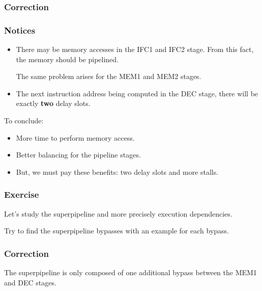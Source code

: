 
\begin{frame}
  \frametitle{Correction}

  \begin{center}
  \end{center}
\end{frame}


\begin{frame}
  \frametitle{Notices}

  \begin{itemize}
    \item
      There may be memory accesses in the IFC1 and IFC2 stage. From this
      fact, the memory should be pipelined.

      \-

      The same problem arises for the MEM1 and MEM2 stages.
    \item
      The next instruction address being computed in the DEC stage, there
      will be exactly \textbf{two} delay slots.
  \end{itemize}

  To conclude:

  \begin{itemize}
    \item
      More time to perform memory access.
    \item
      Better balancing for the pipeline stages.
    \item
      But, we must pay these benefits: two delay slots and more stalls.
  \end{itemize}
\end{frame}


\begin{frame}
  \frametitle{Exercise}

  Let's study the superpipeline and more precisely execution dependencies.

  \-

  Try to find the superpipeline bypasses with an example for each bypass.
\end{frame}


\begin{frame}
  \frametitle{Correction}

  The superpipeline is only composed of one additional bypass between
  the MEM1 and DEC stages.

  \begin{center}
  \end{center}
\end{frame}

